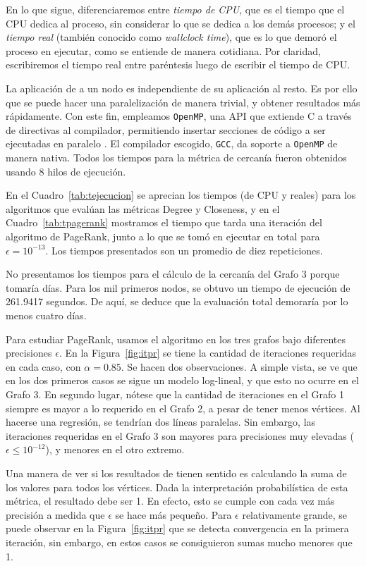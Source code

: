 \documentclass[journal]{IEEEtran}
\newcommand{\pkg}[1]{\texttt{#1}}
\begin{document}
En lo que sigue, diferenciaremos entre \textit{tiempo de CPU}, que es el tiempo que el CPU dedica al proceso, sin considerar lo que se dedica a los demás procesos; y el \textit{tiempo real} (también conocido como \textit{wallclock time}), que es lo que demoró el proceso en ejecutar, como se entiende de manera cotidiana. Por claridad, escribiremos el tiempo real entre paréntesis luego de escribir el tiempo de CPU.

La aplicación de  a un nodo es independiente de su aplicación al resto. Es por ello que se puede hacer una paralelización de manera trivial, y obtener resultados más rápidamente. Con este fin, empleamos \pkg{OpenMP}, una API que extiende C a través de directivas al compilador, permitiendo insertar secciones de código a ser ejecutadas en paralelo \cite{openmp}. El compilador escogido, \pkg{GCC}, da soporte a \pkg{OpenMP} de manera nativa. Todos los tiempos para la métrica de cercanía fueron obtenidos usando 8 hilos de ejecución.

En el Cuadro~\ref{tab:tejecucion} se aprecian los tiempos (de CPU y reales) para los algoritmos que evalúan las métricas Degree y Closeness, y en el Cuadro~\ref{tab:tpagerank} mostramos el tiempo que tarda una iteración del algoritmo de PageRank, junto a lo que se tomó en ejecutar en total para \( \epsilon = 10^{-13}\). Los tiempos presentados son un promedio de diez repeticiones.

No presentamos los tiempos para el cálculo de la cercanía del Grafo 3 porque tomaría días. Para los mil primeros nodos, se obtuvo un tiempo de ejecución de \num{261.9417} segundos. De aquí, se deduce que la evaluación total demoraría por lo menos cuatro días.

Para estudiar PageRank, usamos el algoritmo en los tres grafos bajo diferentes precisiones \(\epsilon\). En la Figura~\ref{fig:itpr} se tiene la cantidad de iteraciones requeridas en cada caso, con \(\alpha = 0.85\). Se hacen dos observaciones. A simple vista, se ve que en los dos primeros casos se sigue un modelo log-lineal, y que esto no ocurre en el Grafo 3. En segundo lugar, nótese que la cantidad de iteraciones en el Grafo 1 siempre es mayor a lo requerido en el Grafo 2, a pesar de tener menos vértices. Al hacerse una regresión, se tendrían dos líneas paralelas. Sin embargo, las iteraciones requeridas en el Grafo 3 son mayores para precisiones muy elevadas (\(\epsilon \leq 10^{-12} \)), y menores en el otro extremo.

Una manera de ver si los resultados de  tienen sentido es calculando la suma de los valores para todos los vértices. Dada la interpretación probabilística de esta métrica, el resultado debe ser 1. En efecto, esto se cumple con cada vez más precisión a medida que \(\epsilon\) se hace más pequeño. Para \(\epsilon\) relativamente grande, se puede observar en la Figura~\ref{fig:itpr} que se detecta convergencia en la primera iteración, sin embargo, en estos casos se consiguieron sumas mucho menores que 1.
\end{document}
